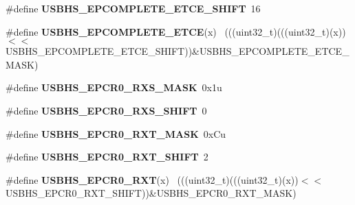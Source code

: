 \begin{DoxyCompactItemize}
\item 
\hypertarget{group___u_s_b_h_s___register___masks_ga5ca7d45124e4a4328ec579438825875e}{}\#define {\bfseries U\+S\+B\+H\+S\+\_\+\+E\+P\+C\+O\+M\+P\+L\+E\+T\+E\+\_\+\+E\+T\+C\+E\+\_\+\+S\+H\+I\+F\+T}~16\label{group___u_s_b_h_s___register___masks_ga5ca7d45124e4a4328ec579438825875e}

\item 
\hypertarget{group___u_s_b_h_s___register___masks_ga43c1e943198cfe434e315f17facb9cfc}{}\#define {\bfseries U\+S\+B\+H\+S\+\_\+\+E\+P\+C\+O\+M\+P\+L\+E\+T\+E\+\_\+\+E\+T\+C\+E}(x)                              ~(((uint32\+\_\+t)(((uint32\+\_\+t)(x))$<$$<$U\+S\+B\+H\+S\+\_\+\+E\+P\+C\+O\+M\+P\+L\+E\+T\+E\+\_\+\+E\+T\+C\+E\+\_\+\+S\+H\+I\+F\+T))\&U\+S\+B\+H\+S\+\_\+\+E\+P\+C\+O\+M\+P\+L\+E\+T\+E\+\_\+\+E\+T\+C\+E\+\_\+\+M\+A\+S\+K)\label{group___u_s_b_h_s___register___masks_ga43c1e943198cfe434e315f17facb9cfc}

\item 
\hypertarget{group___u_s_b_h_s___register___masks_ga221b605a3e03830830fea19be59a3133}{}\#define {\bfseries U\+S\+B\+H\+S\+\_\+\+E\+P\+C\+R0\+\_\+\+R\+X\+S\+\_\+\+M\+A\+S\+K}~0x1u\label{group___u_s_b_h_s___register___masks_ga221b605a3e03830830fea19be59a3133}

\item 
\hypertarget{group___u_s_b_h_s___register___masks_gad1ac3e2086b5580a5efa41a34baafa92}{}\#define {\bfseries U\+S\+B\+H\+S\+\_\+\+E\+P\+C\+R0\+\_\+\+R\+X\+S\+\_\+\+S\+H\+I\+F\+T}~0\label{group___u_s_b_h_s___register___masks_gad1ac3e2086b5580a5efa41a34baafa92}

\item 
\hypertarget{group___u_s_b_h_s___register___masks_ga30899e541d317046061c057e920eac7b}{}\#define {\bfseries U\+S\+B\+H\+S\+\_\+\+E\+P\+C\+R0\+\_\+\+R\+X\+T\+\_\+\+M\+A\+S\+K}~0x\+Cu\label{group___u_s_b_h_s___register___masks_ga30899e541d317046061c057e920eac7b}

\item 
\hypertarget{group___u_s_b_h_s___register___masks_gac8fab896d4888212cf542bcd01126dd7}{}\#define {\bfseries U\+S\+B\+H\+S\+\_\+\+E\+P\+C\+R0\+\_\+\+R\+X\+T\+\_\+\+S\+H\+I\+F\+T}~2\label{group___u_s_b_h_s___register___masks_gac8fab896d4888212cf542bcd01126dd7}

\item 
\hypertarget{group___u_s_b_h_s___register___masks_ga2ce9db843ebf39d2aadfe86fb2737948}{}\#define {\bfseries U\+S\+B\+H\+S\+\_\+\+E\+P\+C\+R0\+\_\+\+R\+X\+T}(x)                                          ~(((uint32\+\_\+t)(((uint32\+\_\+t)(x))$<$$<$U\+S\+B\+H\+S\+\_\+\+E\+P\+C\+R0\+\_\+\+R\+X\+T\+\_\+\+S\+H\+I\+F\+T))\&U\+S\+B\+H\+S\+\_\+\+E\+P\+C\+R0\+\_\+\+R\+X\+T\+\_\+\+M\+A\+S\+K)\label{group___u_s_b_h_s___register___masks_ga2ce9db843ebf39d2aadfe86fb2737948}


\end{DoxyCompactItemize}
